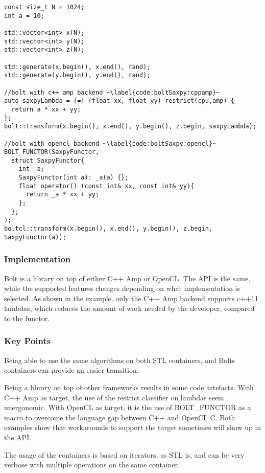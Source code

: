 \begin{lstlisting}[caption={Bolt saxpy example}, label={code:boltSaxpy}]
const size_t N = 1024;
int a = 10;

std::vector<int> x(N);
std::vector<int> y(N);
std::vector<int> z(N);

std::generate(x.begin(), x.end(), rand);
std::generate(y.begin(), y.end(), rand);

//bolt with c++ amp backend ~\label{code:boltSaxpy:cppamp}~
auto saxpyLambda = [=] (float xx, float yy) restrict(cpu,amp) {
  return a * xx + yy;
};
bolt::transform(x.begin(), x.end(), y.begin(), z.begin, saxpyLambda);

//bolt with opencl backend ~\label{code:boltSaxpy:opencl}~
BOLT_FUNCTOR(SaxpyFunctor,
  struct SaxpyFunctor{
    int _a;
    SaxpyFunctor(int a): _a(a) {};
    float operator() (const int& xx, const int& yy){
      return _a * xx + yy;
    };
  };
);
boltcl::transform(x.begin(), x.end(), y.begin(), z.begin, SaxpyFunctor(a));
\end{lstlisting}

\subsubsection{Implementation}
Bolt is a library on top of either C++ Amp or OpenCL. The API is the same, while the supported features changes depending on what implementation is selected.
As shown in the example, only the C++ Amp backend supports c++11 lambdas, which reduces the amount of work needed by the developer, compared to the functor.

\subsubsection{Key Points}
Being able to use the same algorithms on both STL containers, and Bolts containers can provide an easier transition.

Being a library on top of other frameworks results in some code artefacts. With C++ Amp as target, the use of the restrict classifier on lambdas seem unergonomic. With OpenCL as target, it is the use of BOLT\_FUNCTOR as a macro to overcome the language gap between C++ and OpenCL C. Both examples show that workarounds to support the target sometimes will show up in the API. 

The usage of the containers is based on iterators, as STL is, and can be very verbose with multiple operations on the same container.

